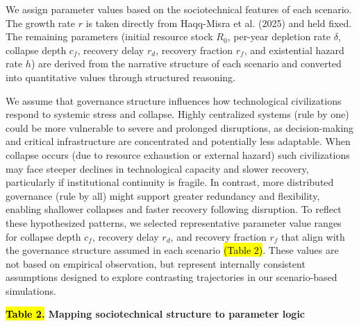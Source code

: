 We assign parameter values based on the sociotechnical features of each scenario. The growth rate \(r\) is taken directly from Haqq-Misra et al. (2025) and held fixed. The remaining parameters (initial resource stock \(R_{0}\), per-year depletion rate \(\delta\), collapse depth \(c_{f}\), recovery delay \(r_{d}\), recovery fraction \(r_{f}\), and existential hazard rate \(h\)) are derived from the narrative structure of each scenario and converted into quantitative values through structured reasoning.

We assume that governance structure influences how technological civilizations respond to systemic stress and collapse. Highly centralized systems (rule by one) could be more vulnerable to severe and prolonged disruptions, as decision-making and critical infrastructure are concentrated and potentially less adaptable. When collapse occurs (due to resource exhaustion or external hazard) such civilizations may face steeper declines in technological capacity and slower recovery, particularly if institutional continuity is fragile. In contrast, more distributed governance (rule by all) might support greater redundancy and flexibility, enabling shallower collapses and faster recovery following disruption. To reflect these hypothesized patterns, we selected representative parameter value ranges for collapse depth \(c_{f}\), recovery delay \(r_{d}\), and recovery fraction \(r_{f}\) that align with the governance structure assumed in each scenario \hl{(Table 2)}. These values are not based on empirical observation, but represent internally consistent assumptions designed to explore contrasting trajectories in our scenario-based simulations.

\textbf{\hl{Table 2.} Mapping sociotechnical structure to parameter logic}

